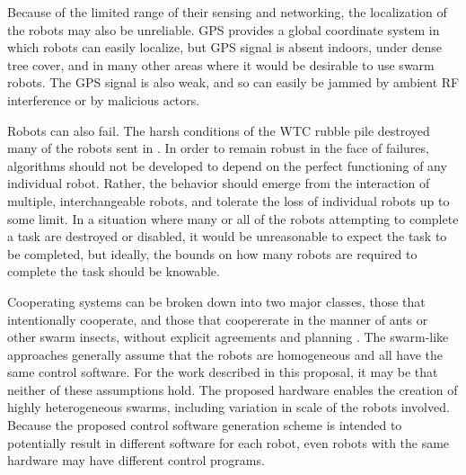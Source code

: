 \documentclass[]{article}
\begin{document}
Because of the limited range of their sensing and networking, the localization of the robots may also be unreliable. 
GPS provides a global coordinate system in which robots can easily localize, but GPS signal is absent indoors, under dense tree cover, and in many other areas where it would be desirable to use swarm robots. 
The GPS signal is also weak, and so can easily be jammed by ambient RF interference or by malicious actors. 

Robots can also fail. 
The harsh conditions of the WTC rubble pile destroyed many of the robots sent in \cite{Micire02analysisof}.
In order to remain robust in the face of failures, algorithms should not be developed to depend on the perfect functioning of any individual robot. 
Rather, the behavior should emerge from the interaction of multiple, interchangeable robots, and tolerate the loss of individual robots up to some limit. 
In a situation where many or all of the robots attempting to complete a task are destroyed or disabled, it would be unreasonable to expect the task to be completed, but ideally, the bounds on how many robots are required to complete the task should be knowable. 

Cooperating systems can be broken down into two major classes, those that intentionally cooperate, and those that coopererate in the manner of ants or other swarm insects, without explicit agreements and planning \cite{parker1998alliance}.
The swarm-like approaches generally assume that the robots are homogeneous and all have the same control software. 
For the work described in this proposal, it may be that neither of these assumptions hold. 
The proposed hardware enables the creation of highly heterogeneous swarms, including variation in scale of the robots involved. 
Because the proposed control software generation scheme is intended to potentially result in different software for each robot, even robots with the same hardware may have different control programs. 

\end{document}
